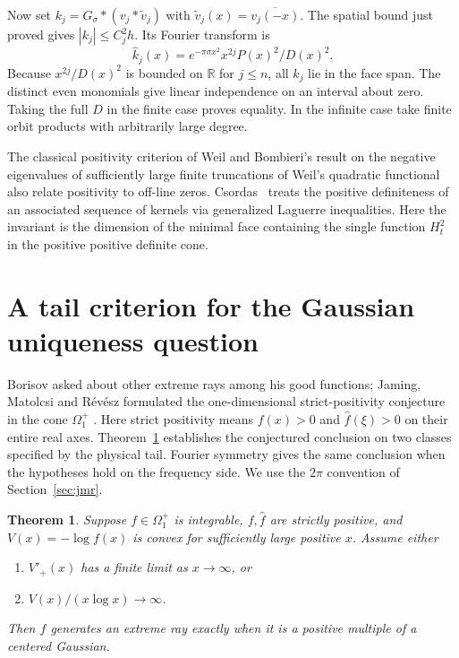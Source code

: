 \documentclass[11pt,a4paper]{article}
\newtheorem{theorem}{Theorem}[section]\newtheorem{lemma}[theorem]{Lemma}\newtheorem{proposition}[theorem]{Proposition}\newtheorem{corollary}[theorem]{Corollary}
\numberwithin{equation}{section}
\begin{document}
Now set $k_j=G_\sigma*(v_j*\widetilde v_j)$ with
$\widetilde v_j(x)=\overline{v_j(-x)}$. The spatial bound just proved
gives $|k_j|\le C_j^2 h$. Its Fourier transform is
\[
 \widehat k_j(x)=e^{-\pi\sigma x^2} x^{2j}P(x)^2/D(x)^2.
\]
Because $x^{2j}/D(x)^2$ is bounded on $\mathbb R$ for $j\le n$,
all $k_j$ lie in the face span. The distinct even monomials give
linear independence on an interval about zero. Taking the full $D$
in the finite case proves equality. In the infinite case take finite
orbit products with arbitrarily large degree.

The classical positivity criterion of Weil and Bombieri's result on the
negative eigenvalues of sufficiently large finite truncations of Weil's
quadratic functional~\cite{BombieriWeil} also relate positivity to
off-line zeros. Csordas~\cite{CsordasXi} treats the positive definiteness
of an associated sequence of kernels via generalized Laguerre inequalities.
Here the invariant is the dimension of the minimal face containing
the single function $H_t^2$ in the positive positive definite cone.

\section{A tail criterion for the Gaussian uniqueness question}
\label{sec:tails}
Borisov asked about other extreme rays among his good functions; Jaming, Matolcsi and R\'ev\'esz formulated the one-dimensional strict-positivity conjecture in the cone $\Omega_1^+$ \cite[Sec.~5]{Borisov}\cite[Sec.~6]{JMR2009}. Here strict positivity means $f(x)>0$ and $\widehat f(\xi)>0$ on their entire real axes. Theorem~\ref{thm:tail} establishes the conjectured conclusion on two classes specified by the physical tail. Fourier symmetry gives the same conclusion when the hypotheses hold on the frequency side. We use the $2\pi$ convention of Section~\ref{sec:jmr}.

\begin{theorem}\label{thm:tail}
Suppose $f\in\Omega_1^+$ is integrable, $f,\widehat f$ are strictly positive, and $V(x)=-\log f(x)$ is convex for sufficiently large positive $x$. Assume either
\begin{enumerate}
\item $V'_+(x)$ has a finite limit as $x\to\infty$, or
\item $V(x)/(x\log x)\to\infty$.
\end{enumerate}
Then $f$ generates an extreme ray exactly when it is a positive multiple of a centered Gaussian.
\end{theorem}
\end{document}
